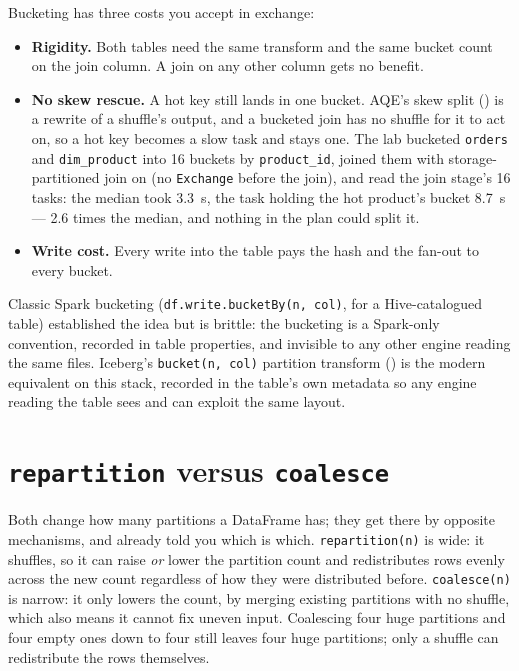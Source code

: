 Bucketing has three costs you accept in exchange:

\begin{itemize}
  \item \textbf{Rigidity.} Both tables need the same transform and the same bucket
        count on the join column. A join on any other column gets no benefit.
  \item \textbf{No skew rescue.} A hot key still lands in one bucket. AQE's skew
        split () is a rewrite of a shuffle's output, and a
        bucketed join has no shuffle for it to act on, so a hot key becomes a
        slow task and stays one. The lab bucketed \texttt{orders} and \texttt{dim\_product}
into 16 buckets by \texttt{product\_id}, joined them with storage-partitioned join
on (no \texttt{Exchange} before the join), and read the join stage's 16 tasks: the
median took 3.3~s, the task holding the hot product's bucket 8.7~s --- 2.6 times the
median, and nothing in the plan could split it.
  \item \textbf{Write cost.} Every write into the table pays the hash and the
        fan-out to every bucket.
\end{itemize}

Classic Spark bucketing (\texttt{df.write.bucketBy(n, col)}, for a
Hive-catalogued table) established the idea but is brittle: the bucketing is a
Spark-only convention, recorded in table properties, and invisible to any other
engine reading the same files. Iceberg's \texttt{bucket(n, col)} partition
transform () is the modern equivalent on this stack,
recorded in the table's own metadata so any engine reading the table sees and can
exploit the same layout.

\section{\texttt{repartition} versus \texttt{coalesce}}
\label{sec:repartition-coalesce}

Both change how many partitions a DataFrame has; they get there by opposite
mechanisms, and  already told you which is which.
\texttt{repartition(n)} is wide: it shuffles, so it can raise \emph{or} lower the
partition count and redistributes rows evenly across the new count regardless of
how they were distributed before. \texttt{coalesce(n)} is narrow: it only lowers
the count, by merging existing partitions with no shuffle, which also means it
cannot fix uneven input. Coalescing four huge partitions and four empty ones down
to four still leaves four huge partitions; only a shuffle can redistribute the
rows themselves.

